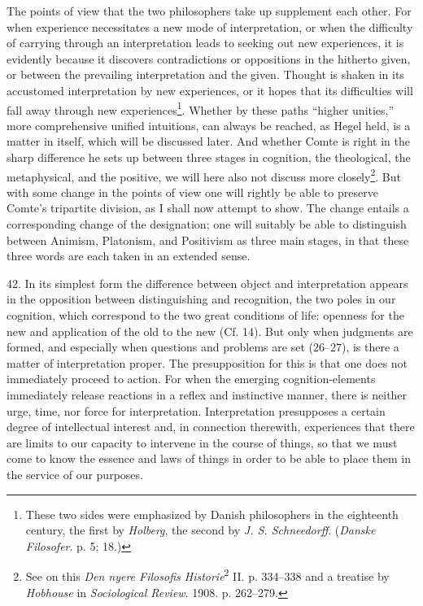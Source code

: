\documentclass[12pt,a4paper]{book}
\newcommand{\opage}[1]{\marginnote{\footnotesize\textit{[#1]}}}
\begin{document}
The points of view that the two philosophers take up supplement each
other. For when experience necessitates a new mode of interpretation, or
when the difficulty of carrying through an interpretation leads to seeking
out new experiences, it is evidently because it discovers contradictions or
oppositions in the hitherto given, or between the prevailing interpretation
and the given. Thought is shaken in its accustomed interpretation by new
experiences, or it hopes that its difficulties will fall away through new
experiences\footnote{These two sides were emphasized by Danish philosophers
in the eighteenth century, the first by \emph{Holberg}, the second by
\emph{J. S. Schneedorff}. (\emph{Danske Filosofer}. p. 5; 18.)}. Whether by
these paths ``higher unities,'' more comprehensive unified intuitions, can
always \opage{113}be reached, as Hegel held, is a matter in itself, which will be
discussed later. And whether Comte is right in the sharp difference he sets
up between three stages in cognition, the theological, the metaphysical,
and the positive, we will here also not discuss more closely\footnote{See
on this \emph{Den nyere Filosofis Historie}\textsuperscript{2} II. p.
334--338 and a treatise by \emph{Hobhouse} in \emph{Sociological Review}.
1908. p. 262--279.}. But with some change in the points of view one will
rightly be able to preserve Comte's tripartite division, as I shall now
attempt to show. The change entails a corresponding change of the
designation; one will suitably be able to distinguish between Animism,
Platonism, and Positivism as three main stages, in that these three words
are each taken in an extended sense.

42. In its simplest form the difference between object and interpretation
appears in the opposition between distinguishing and recognition, the two
poles in our cognition, which correspond to the two great conditions of
life: openness for the new and application of the old to the new (Cf. 14).
But only when judgments are formed, and especially when questions and
problems are set (26--27), is there a matter of interpretation proper. The
presupposition for this is that one does not immediately proceed to action.
For when the emerging cognition-elements immediately release reactions in a
reflex and instinctive manner, there is neither urge, time, nor force for
interpretation. Interpretation presupposes a certain degree of intellectual
interest and, in connection therewith, experiences that there are limits to
our capacity to intervene in the course of things, so that we must come to
know the essence and laws of things in order to be able to place them in
the service of our purposes.
\end{document}
